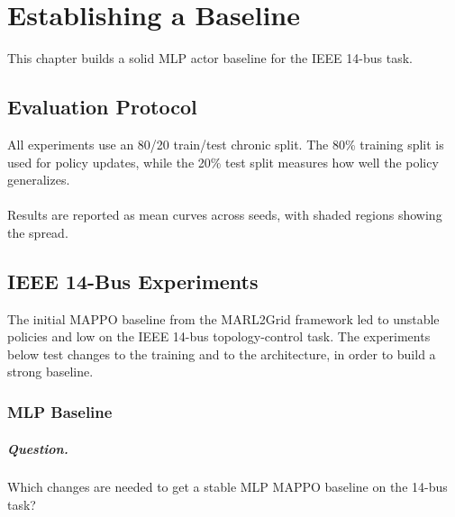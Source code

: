 \chapter{Establishing a Baseline}
\label{ch:baseline}

This chapter builds a solid MLP actor baseline for the IEEE 14-bus task.

\section{Evaluation Protocol}
\label{sec:results-evaluation-protocol}

All experiments use an 80/20 train/test chronic split. The 80\% training split
is used for policy updates, while the 20\% test split measures how well the
policy generalizes. 
\\
\\
 Results are reported as mean curves across
seeds, with shaded regions showing the spread.

\section{IEEE 14-Bus Experiments}
\label{sec:bus14-results}

The initial MAPPO baseline from the MARL2Grid framework led to unstable policies
and low  on the IEEE 14-bus topology-control task. The experiments
below test changes to the training and to the architecture, in order to build a
strong baseline.

\subsection{MLP Baseline}
\label{subsec:a0-core-reruns}

\paragraph{Question.}
Which changes are needed to get a stable MLP MAPPO baseline on the 14-bus
task?

